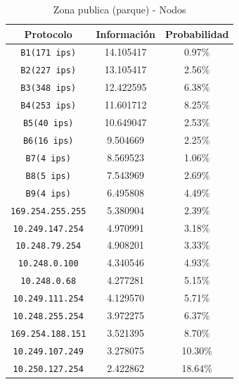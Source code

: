 \documentclass[final,inline,narroweqnarray,a4paper]{ieee}
\begin{document}
\begin{table}[H]
    \begin{center}
        \begin{tabular}{|c|c|c|}
            \hline
            \textbf{Protocolo} & \textbf{Información} & \textbf{Probabilidad} \\ \hline
            \texttt{B1(171 ips)}    &14.105417        & 0.97\%     \\ \hline
            \texttt{B2(227 ips)}    &13.105417        & 2.56\%     \\ \hline
            \texttt{B3(348 ips)}    &12.422595        & 6.38\%     \\ \hline
            \texttt{B4(253 ips)}    &11.601712        & 8.25\%     \\ \hline
            \texttt{B5(40 ips)}     &10.649047        & 2.53\%     \\ \hline
            \texttt{B6(16 ips)}     &9.504669         & 2.25\%     \\ \hline       
            \texttt{B7(4 ips)}      &8.569523         & 1.06\%     \\ \hline
            \texttt{B8(5 ips)}      &7.543969         & 2.69\%     \\ \hline
            \texttt{B9(4 ips)}      &6.495808         & 4.49\%     \\ \hline
            \texttt{169.254.255.255} &5.380904        & 2.39\%     \\ \hline 
            \texttt{10.249.147.254} &4.970991         & 3.18\%     \\ \hline 
            \texttt{10.248.79.254} &4.908201          & 3.33\%     \\ \hline 
            \texttt{10.248.0.100} &4.340546           & 4.93\%     \\ \hline 
            \texttt{10.248.0.68} &4.277281            & 5.15\%     \\ \hline 
            \texttt{10.249.111.254} &4.129570         & 5.71\%     \\ \hline 
            \texttt{10.248.255.254} &3.972275         & 6.37\%     \\ \hline 
            \texttt{169.254.188.151} &3.521395        & 8.70\%     \\ \hline 
            \texttt{10.249.107.249} &3.278075         &10.30\%     \\ \hline 
            \texttt{10.250.127.254} &2.422862         &18.64\%     \\ \hline
        \end{tabular}
        \caption{Zona publica (parque) - Nodos}
        \label{table:parqueS1}
    \end{center}
\end{table}
\end{document}
